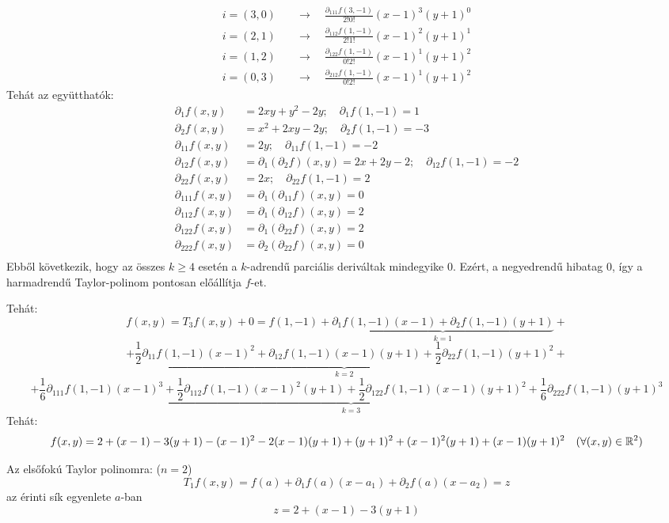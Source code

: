 \documentclass[a4paper,11.5pt]{article}
\begin{document}
\begin{example}
\begin{align*}
			i=(3,0)&\quad \to\quad \frac{\partial_{111}f(3,-1)}{2!0!}(x-1)^3(y+1)^0\\
			i=(2,1)&\quad \to\quad \frac{\partial_{112}f(1,-1)}{2!1!}(x-1)^2(y+1)^1\\
			i=(1,2)&\quad \to\quad \frac{\partial_{122}f(1,-1)}{0!2!}(x-1)^1(y+1)^2\\
			i=(0,3)&\quad \to\quad \frac{\partial_{212}f(1,-1)}{0!2!}(x-1)^1(y+1)^2
		\end{align*}
		Tehát az együtthatók:
		\begin{align*}
			\partial_1f(x,y)&=2xy+y^2-2y;\quad \partial_1f(1,-1)=1\\
			\partial_2f(x,y)&=x^2+2xy-2y;\quad \partial_2f(1,-1)=-3\\
			\partial_{11}f(x,y)&=2y;\quad \partial_{11}f(1,-1)=-2\\
			\partial_{12}f(x,y)&=\partial_1(\partial_2f)(x,y)=2x+2y-2;\quad \partial_{12}f(1,-1)=-2\\
			\partial_{22}f(x,y)&=2x;\quad \partial_{22}f(1,-1)=2\\
			\partial_{111}f(x,y)&=\partial_1(\partial_{11}f)(x,y)=0\\
			\partial_{112}f(x,y)&=\partial_1(\partial_{12}f)(x,y)=2\\
			\partial_{122}f(x,y)&=\partial_1(\partial_{22}f)(x,y)=2\\
			\partial_{222}f(x,y)&=\partial_2(\partial_{22}f)(x,y)=0\\
		\end{align*}
		Ebből következik, hogy az összes $k\geq4$ esetén a $k$-adrendű parciális deriváltak mindegyike 0. Ezért, a negyedrendű hibatag 0, így a harmadrendű Taylor-polinom pontosan előállítja $f$-et.
		
		Tehát:
		\[ f(x,y)=T_3f(x,y)+0=f(1,-1)+\underbrace{\partial_1f(1,-1)(x-1)+\partial_2f(1,-1)(y+1)}_{k=1}+\]
		\[+\underbrace{\frac{1}{2}\partial_{11}f(1,-1)(x-1)^2+\partial_{12}f(1,-1)(x-1)(y+1)+\frac{1}{2}\partial_{22}f(1,-1)(y+1)^2}_{k=2}+\]
		\[+\underbrace{\frac{1}{6}\partial_{111}f(1,-1)(x-1)^3+\frac{1}{2}\partial_{112}f(1,-1)(x-1)^2(y+1)+\frac{1}{2}\partial_{122}f(1,-1)(x-1)(y+1)^2+\frac{1}{6}\partial_{222}f(1,-1)(y+1)^3}_{k=3} \]
		Tehát:
		\[ f(x,y)=2+(x-1)-3(y+1)-(x-1)^2-2(x-1)(y+1)+(y+1)^2+(x-1)^2(y+1)+(x-1)(y+1)^2 \quad (\forall(x,y)\in\mathbb{R}^2)\]
	\end{example}
	\begin{note}
		Az elsőfokú Taylor polinomra: ($n=2$)
		\[ T_1f(x,y)=f(a)+\partial_1f(a)(x-a_1)+\partial_2f(a)(x-a_2)=z \]
		az érinti sík egyenlete $a$-ban
		\[ z=2+(x-1)-3(y+1) \]
	\end{note}
\end{document}

